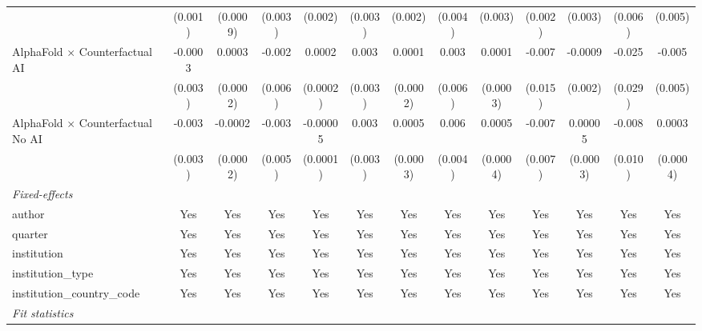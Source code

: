 \begin{tabular}{lcccccccccccc}
                                            & (0.001)       & (0.0009)       & (0.003)      & (0.002)       & (0.003) & (0.002)  & (0.004) & (0.003)  & (0.002)       & (0.003)       & (0.006)      & (0.005)\\   
   AlphaFold $\times$ Counterfactual AI     & -0.0003       & 0.0003         & -0.002       & 0.0002        & 0.003   & 0.0001   & 0.003   & 0.0001   & -0.007        & -0.0009       & -0.025       & -0.005\\   
                                            & (0.003)       & (0.0002)       & (0.006)      & (0.0002)      & (0.003) & (0.0002) & (0.006) & (0.0003) & (0.015)       & (0.002)       & (0.029)      & (0.005)\\   
   AlphaFold $\times$ Counterfactual No AI  & -0.003        & -0.0002        & -0.003       & -0.00005      & 0.003   & 0.0005   & 0.006   & 0.0005   & -0.007        & 0.00005       & -0.008       & 0.0003\\   
                                            & (0.003)       & (0.0002)       & (0.005)      & (0.0001)      & (0.003) & (0.0003) & (0.004) & (0.0004) & (0.007)       & (0.0003)      & (0.010)      & (0.0004)\\   
   \midrule
   \emph{Fixed-effects}\\
   author                                   & Yes           & Yes            & Yes          & Yes           & Yes     & Yes      & Yes     & Yes      & Yes           & Yes           & Yes          & Yes\\  
   quarter                                  & Yes           & Yes            & Yes          & Yes           & Yes     & Yes      & Yes     & Yes      & Yes           & Yes           & Yes          & Yes\\  
   institution                              & Yes           & Yes            & Yes          & Yes           & Yes     & Yes      & Yes     & Yes      & Yes           & Yes           & Yes          & Yes\\  
   institution\_type                        & Yes           & Yes            & Yes          & Yes           & Yes     & Yes      & Yes     & Yes      & Yes           & Yes           & Yes          & Yes\\  
   institution\_country\_code               & Yes           & Yes            & Yes          & Yes           & Yes     & Yes      & Yes     & Yes      & Yes           & Yes           & Yes          & Yes\\  
   \midrule
   \emph{Fit statistics}\\

\end{tabular}
